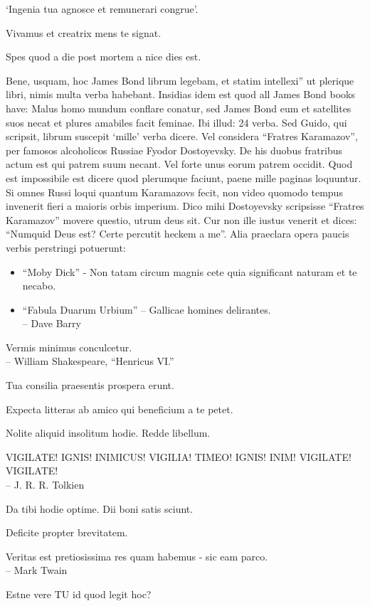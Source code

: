 \documentclass[titlepage,12pt]{memoir}
\begin{document}
‘Ingenia tua agnosce et remunerari congrue’.

Vivamus et creatrix mens te signat.

Spes quod a die post mortem a nice dies est.

Bene, usquam, hoc James Bond librum legebam, et statim intellexi”
ut plerique libri, nimis multa verba habebant. Insidias idem est quod
all James Bond books have: Malus homo mundum conflare conatur, sed
James Bond eum et satellites suos necat et plures amabiles facit
feminae. Ibi illud: 24 verba. Sed Guido, qui scripsit, librum suscepit
‘mille’ verba dicere.
Vel considera “Fratres Karamazov”, per famosos alcoholicos Russiae
Fyodor Dostoyevsky. De his duobus fratribus actum est qui patrem suum necant.
Vel forte unus eorum patrem occidit. Quod est impossibile est dicere
quod plerumque faciunt, paene mille paginas loquuntur. Si omnes Russi loqui
quantum Karamazovs fecit, non video quomodo tempus invenerit fieri a
maioris orbis imperium.
Dico mihi Dostoyevsky scripsisse “Fratres Karamazov” movere
questio, utrum deus sit. Cur non ille iustus venerit
et dices: “Numquid Deus est? Certe percutit heckem a me”.
Alia praeclara opera paucis verbis perstringi potuerunt:
\begin{itemize}
\item “Moby Dick” - Non tatam circum magnis cete quia significant
  naturam et te necabo.
\item “Fabula Duarum Urbium” -- Gallicae homines delirantes.
\\-- Dave Barry
\end{itemize}

Vermis minimus conculcetur.
\\-- William Shakespeare, “Henricus VI.”

Tua consilia praesentis prospera erunt.

Expecta litteras ab amico qui beneficium a te petet.

Nolite aliquid insolitum hodie. Redde libellum.

VIGILATE! IGNIS! INIMICUS! VIGILIA!
TIMEO! IGNIS! INIM!
VIGILATE! VIGILATE!
\\-- J. R. R. Tolkien

Da tibi hodie optime. Dii boni satis sciunt.

Deficite propter brevitatem.

Veritas est pretiosissima res quam habemus - sic eam parco.
\\-- Mark Twain

Estne vere TU id quod legit hoc?
\end{document}
